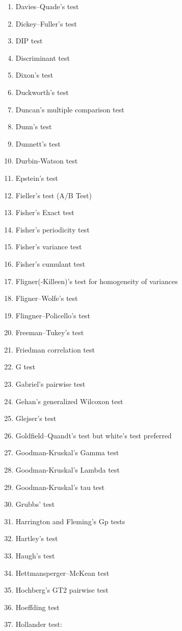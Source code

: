 \begin{itemize}
\begin{multicols}{3}
\begin{enumerate}
			\item Davies–Quade's test
			\item Dickey–Fuller's test 
			\item DIP test
			\item Discriminant test 
			\item Dixon's test
			\item Duckworth's test
			\item Duncan's multiple comparison test
			\item Dunn's test
			\item Dunnett's test
			\item Durbin-Watson test
			\item Epstein's test
			\item Fieller's test (A/B Test)
			\item Fisher's Exact test
			\item Fisher's periodicity test
			\item Fisher's variance test
			\item Fisher's cumulant test
			\item Fligner(-Killeen)'s test for homogeneity of variances
			\item Fligner–Wolfe's test
			\item Flingner–Policello's test
			\item Freeman–Tukey's test
			\item Friedman correlation test
			\item G test
			\item Gabriel's pairwise test
			\item Gehan's generalized Wilcoxon test
			\item Glejser's test
			\item Goldfield–Quandt's test but white's test preferred
			\item Goodman-Kruskal's Gamma test
			\item Goodman-Kruskal's Lambda test
			\item Goodman-Kruskal's tau test
			\item Grubbs' test
			\item Harrington and Fleming's Gp tests
			\item Hartley's test
			\item Haugh's test
			\item Hettmansperger–McKean test
			\item Hochberg's GT2 pairwise test
			\item Hoeffding test
			\item Hollander test:

\end{enumerate}
\end{multicols}
\end{itemize}
